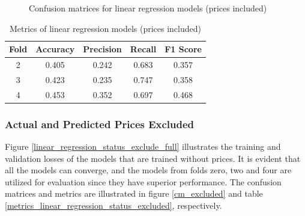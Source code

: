 \documentclass[12pt,twoside]{report}
\begin{document}
\begin{figure}[!htbp]
	\centering
	\hfill
	\hfill
	\caption{Confusion matrices for linear regression models (prices included)}
	\label{cm_included}
\end{figure}

\begin{table}[!htbp]
	\centering
	\caption{Metrics of linear regression models (prices included)}
	\label{metrics_linear_regression_status_included}
	\begin{tabular}{| c | c | c | c | c |}
		\hline
		Fold & Accuracy & Precision & Recall & F1 Score \\
		\hline
		2 & 0.405 & 0.242 & 0.683 & 0.357 \\
		\hline
		3 & 0.423 & 0.235 & 0.747 & 0.358 \\
		\hline
		4 & 0.453 & 0.352 & 0.697 & 0.468 \\
		\hline
	\end{tabular}
\end{table}

\subsubsection{Actual and Predicted Prices Excluded}
Figure \ref{linear_regression_status_exclude_full} illustrates the training and validation losses of the models that are trained without prices. It is evident that all the models can converge, and the models from folds zero, two and four are utilized for evaluation since they have superior performance. The confusion matrices and metrics are illustrated in figure \ref{cm_excluded} and table \ref{metrics_linear_regression_status_excluded}, respectively. 
\\
\end{document}
